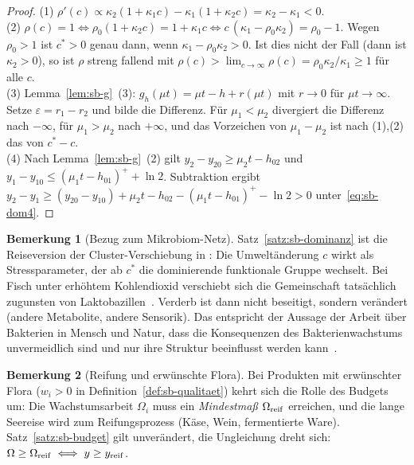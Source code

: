 \documentclass[a4paper, 12pt, twoside, openright]{report}
\theoremstyle{definition}
\theoremstyle{definition}
\newtheorem{bemerkung}{Bemerkung}[chapter]
\begin{document}
\begin{proof}
(1) $\rho'(c)\propto\kappa_2(1+\kappa_1c)-\kappa_1(1+\kappa_2c)=\kappa_2-\kappa_1<0$.\\
(2) $\rho(c)=1\iff\rho_0(1+\kappa_2c)=1+\kappa_1c\iff c\,(\kappa_1-\rho_0\kappa_2)=\rho_0-1$.
Wegen $\rho_0>1$ ist $c^\ast>0$ genau dann, wenn $\kappa_1-\rho_0\kappa_2>0$. Ist dies nicht der Fall
(dann ist $\kappa_2>0$), so ist $\rho$ streng fallend mit
$\rho(c)>\lim_{c\to\infty}\rho(c)=\rho_0\kappa_2/\kappa_1\ge1$ für alle $c$.\\
(3) Lemma~\ref{lem:sb-g}~(3): $g_{h}(\mu t)=\mu t-h+r(\mu t)$ mit $r\to0$ für $\mu t\to\infty$.
Setze $\varepsilon=r_1-r_2$ und bilde die Differenz. Für $\mu_1<\mu_2$ divergiert die Differenz
nach $-\infty$, für $\mu_1>\mu_2$ nach $+\infty$, und das Vorzeichen von $\mu_1-\mu_2$ ist nach
(1),(2) das von $c^\ast-c$.\\
(4) Nach Lemma~\ref{lem:sb-g}~(2) gilt $y_2-y_{20}\ge\mu_2t-h_{02}$ und
$y_1-y_{10}\le(\mu_1t-h_{01})^++\ln2$. Subtraktion ergibt
$y_2-y_1\ge(y_{20}-y_{10})+\mu_2t-h_{02}-(\mu_1t-h_{01})^+-\ln2>0$ unter~\eqref{eq:sb-dom4}.
\end{proof}

\begin{bemerkung}[Bezug zum Mikrobiom-Netz]
Satz~\ref{satz:sb-dominanz} ist die Reiseversion der Cluster-Verschiebung in
\cite{epp_bgies}: Die Umweltänderung $c$ wirkt als Stressparameter, der ab $c^\ast$ die
dominierende funktionale Gruppe wechselt. Bei Fisch unter erhöhtem Kohlendioxid
verschiebt sich die Gemeinschaft tatsächlich zugunsten von Laktobazillen~\cite{mokhele1983,leroi2010}.
Verderb ist dann nicht beseitigt, sondern verändert (andere Metabolite, andere
Sensorik). Das entspricht der Aussage der Arbeit über Bakterien in Mensch und
Natur, dass die Konsequenzen des Bakterienwachstums unvermeidlich sind und nur ihre
Struktur beeinflusst werden kann~\cite{epp_bakterien}.
\end{bemerkung}

\begin{bemerkung}[Reifung und erwünschte Flora]\label{bem:sb-reifung}
Bei Produkten mit erwünschter Flora ($w_i>0$ in Definition~\ref{def:sb-qualitaet}) kehrt sich
die Rolle des Budgets um: Die Wachstumsarbeit $\Omega_i$ muss ein \emph{Mindestmaß}
$\Omega_{\rm reif}$ erreichen, und die lange Seereise wird zum Reifungsprozess (Käse, Wein,
fermentierte Ware). Satz~\ref{satz:sb-budget} gilt unverändert, die Ungleichung dreht sich:
$\Omega\ge\Omega_{\rm reif}\iff y\ge y_{\rm reif}$.
\end{bemerkung}
\end{document}
